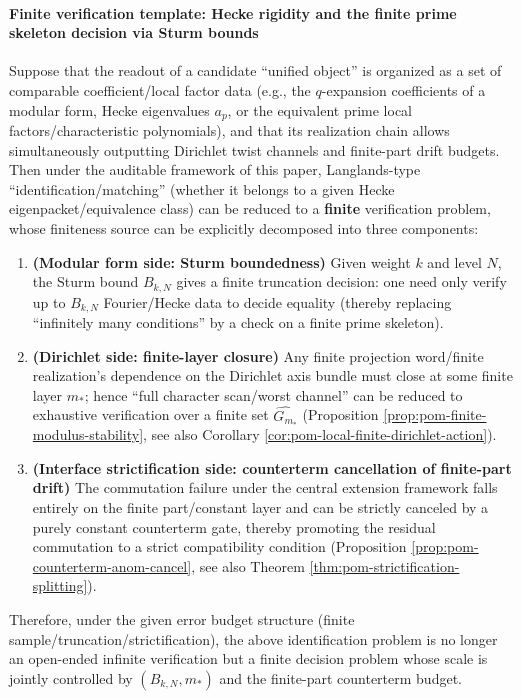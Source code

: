 \paragraph{Finite verification template: Hecke rigidity and the finite prime skeleton decision via Sturm bounds}
\begin{theorem}\label{thm:audit-finite-decidability-sturm-finite-layer}
Suppose that the readout of a candidate ``unified object'' is organized as a set of comparable coefficient/local factor data (e.g., the \(q\)-expansion coefficients of a modular form, Hecke eigenvalues \(a_p\), or the equivalent prime local factors/characteristic polynomials), and that its realization chain allows simultaneously outputting Dirichlet twist channels and finite-part drift budgets.
Then under the auditable framework of this paper, Langlands-type ``identification/matching'' (whether it belongs to a given Hecke eigenpacket/equivalence class) can be reduced to a \textbf{finite} verification problem, whose finiteness source can be explicitly decomposed into three components:
\begin{enumerate}
  \item \textbf{(Modular form side: Sturm boundedness)} Given weight \(k\) and level \(N\), the Sturm bound \(B_{k,N}\) gives a finite truncation decision: one need only verify up to \(B_{k,N}\) Fourier/Hecke data to decide equality (thereby replacing ``infinitely many conditions'' by a check on a finite prime skeleton).
  \item \textbf{(Dirichlet side: finite-layer closure)} Any finite projection word/finite realization's dependence on the Dirichlet axis bundle must close at some finite layer \(m_\ast\); hence ``full character scan/worst channel'' can be reduced to exhaustive verification over a finite set \(\widehat{G_{m_\ast}}\) (Proposition \ref{prop:pom-finite-modulus-stability}, see also Corollary \ref{cor:pom-local-finite-dirichlet-action}).
  \item \textbf{(Interface strictification side: counterterm cancellation of finite-part drift)} The commutation failure under the central extension framework falls entirely on the finite part/constant layer and can be strictly canceled by a purely constant counterterm gate, thereby promoting the residual commutation to a strict compatibility condition (Proposition \ref{prop:pom-counterterm-anom-cancel}, see also Theorem \ref{thm:pom-strictification-splitting}).
\end{enumerate}
Therefore, under the given error budget structure (finite sample/truncation/strictification), the above identification problem is no longer an open-ended infinite verification but a finite decision problem whose scale is jointly controlled by \((B_{k,N},m_\ast)\) and the finite-part counterterm budget.
\end{theorem}

